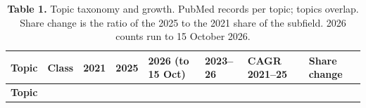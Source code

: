 \documentclass[11pt]{article}
\newenvironment{tablefont}{\par\scriptsize\setlength{\tabcolsep}{3.5pt}}{\par}
\newcommand{\thead}[1]{\textbf{#1}}
\begin{document}
\begin{tablefont}

\begin{longtable}[l]{@{}
  >{\raggedright\arraybackslash}p{}
  >{\raggedright\arraybackslash}p{}
  >{\raggedright\arraybackslash}p{}
  >{\raggedright\arraybackslash}p{}
  >{\raggedright\arraybackslash}p{}
  >{\raggedright\arraybackslash}p{}
  >{\raggedright\arraybackslash}p{}
  >{\raggedright\arraybackslash}p{}@{}}
\caption{\textbf{Table 1.} Topic taxonomy and growth. PubMed records per topic;
topics overlap. Share change is the ratio of the 2025 to the 2021 share
of the subfield. 2026 counts run to 15 October 2026.}\tabularnewline
\toprule
\begin{minipage}[b]{\linewidth}\raggedright
\thead{Topic}
\end{minipage} & \begin{minipage}[b]{\linewidth}\raggedright
\thead{Class}
\end{minipage} & \begin{minipage}[b]{\linewidth}\raggedright
\thead{2021}
\end{minipage} & \begin{minipage}[b]{\linewidth}\raggedright
\thead{2025}
\end{minipage} & \begin{minipage}[b]{\linewidth}\raggedright
\thead{2026 (to 15 Oct)}
\end{minipage} & \begin{minipage}[b]{\linewidth}\raggedright
\thead{2023--26}
\end{minipage} & \begin{minipage}[b]{\linewidth}\raggedright
\thead{CAGR 2021--25}
\end{minipage} & \begin{minipage}[b]{\linewidth}\raggedright
\thead{Share change}
\end{minipage} \\
\midrule
\endfirsthead
\toprule
\begin{minipage}[b]{\linewidth}\raggedright
\thead{Topic}
\end{minipage} & \begin{minipage}[b]{\linewidth}\raggedright

\end{minipage}
\end{longtable}
\end{tablefont}
\end{document}
